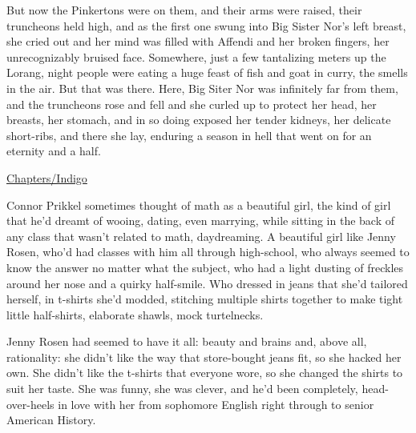 But now the Pinkertons were on them, and their arms were raised,
their truncheons held high, and as the first one swung into Big
Sister Nor's left breast, she cried out and her mind was filled
with Affendi and her broken fingers, her unrecognizably bruised
face. Somewhere, just a few tantalizing meters up the Lorang, night
people were eating a huge feast of fish and goat in curry, the
smells in the air. But that was there. Here, Big Siter Nor was
infinitely far from them, and the truncheons rose and fell and she
curled up to protect her head, her breasts, her stomach, and in so
doing exposed her tender kidneys, her delicate short-ribs, and
there she lay, enduring a season in hell that went on for an
eternity and a half.

\tb

{\href{http://www.chapters.indigo.ca/books/For-The-Win-Cory-Doctorow/9780765322166-item.html}{Chapters/Indigo}}

Connor Prikkel sometimes thought of math as a beautiful girl, the
kind of girl that he'd dreamt of wooing, dating, even marrying,
while sitting in the back of any class that wasn't related to math,
daydreaming. A beautiful girl like Jenny Rosen, who'd had classes
with him all through high-school, who always seemed to know the
answer no matter what the subject, who had a light dusting of
freckles around her nose and a quirky half-smile. Who dressed in
jeans that she'd tailored herself, in t-shirts she'd modded,
stitching multiple shirts together to make tight little
half-shirts, elaborate shawls, mock turtelnecks.

Jenny Rosen had seemed to have it all: beauty and brains and, above
all, rationality: she didn't like the way that store-bought jeans
fit, so she hacked her own. She didn't like the t-shirts that
everyone wore, so she changed the shirts to suit her taste. She was
funny, she was clever, and he'd been completely, head-over-heels in
love with her from sophomore English right through to senior
American History.

